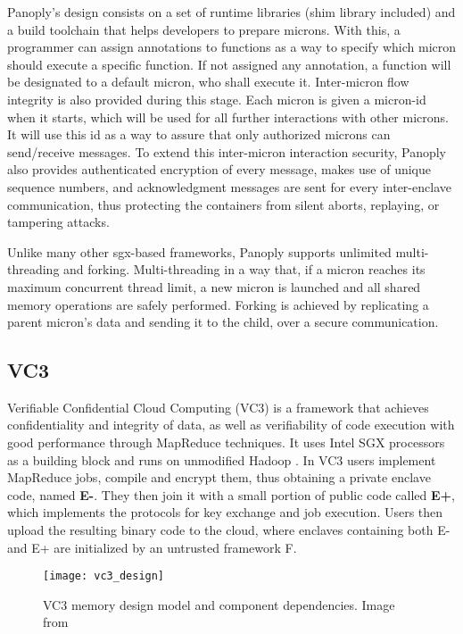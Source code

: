 Panoply's design consists on a set of runtime libraries (shim library included) and a build toolchain that helps developers to prepare microns.
With this, a programmer can assign annotations to functions as a way to specify which micron should execute a specific function. If not assigned any annotation, a function will be designated to a default micron, who shall execute it. Inter-micron flow integrity is also provided during this stage. 
Each micron is given a micron-id when it starts, which will be used for all further interactions with other microns. It will use this id as a way to assure that only authorized microns can send/receive messages.
To extend this inter-micron interaction security, Panoply also provides authenticated encryption of every message, makes use of unique sequence numbers, and acknowledgment messages are sent for every inter-enclave communication, thus protecting the containers from silent aborts, replaying, or tampering attacks.

Unlike many other \gls{sgx}-based frameworks, Panoply supports unlimited multi-threading and forking. Multi-threading in a way that, if a micron reaches its maximum concurrent thread limit, a new micron is launched and all shared memory operations are safely performed. Forking is achieved by replicating a parent micron's data and sending it to the child, over a secure communication. 


\subsection{VC3}
\label{ssec:vc3_mapreduce}

Verifiable Confidential Cloud Computing (VC3) \cite{vc3Paper} is a framework that achieves confidentiality and integrity of data, as well as verifiability of code execution with good performance through MapReduce \cite{mapReduce} techniques. It uses Intel SGX processors as a building block and runs on unmodified Hadoop \cite{hadoop}.
In VC3 users implement MapReduce jobs, compile and encrypt them, thus obtaining a private enclave code, named \textbf{E-}. They then join it with a small portion of public code called \textbf{E+}, which implements the protocols for key exchange and job execution.
Users then upload the resulting binary code to the cloud, where enclaves containing both E- and E+ are initialized by an untrusted framework F. 

\begin{figure}[tbp]
	\centering
	{\texttt{[image: vc3\_design]}}
	\caption{VC3 memory design model and component dependencies. Image from \cite{vc3Paper}}
\end{figure}

